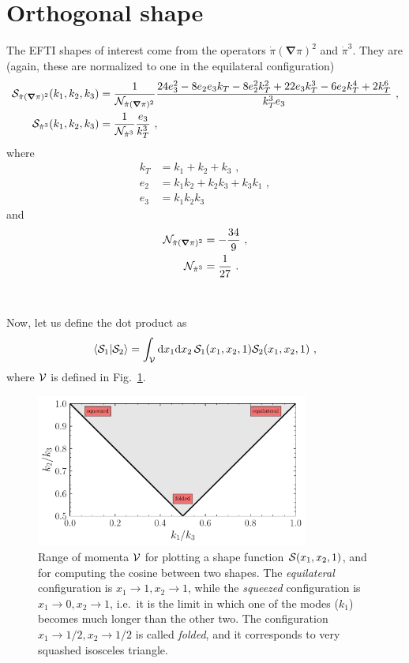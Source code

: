 \documentclass[aps,prd,amsmath,floats,floatfix,superscriptaddress,nofootinbib%
]{revtex4}%
\renewcommand\({\left(}
\renewcommand\){\right)}
\renewcommand\[{\left[}
\renewcommand\]{\right]}
\renewcommand{\vec}{\bm}
\newcommand{\dif}{\mathrm{d}}
\begin{document}
\section{Orthogonal shape}
\label{sec:orthogonal shape}


\noindent The EFTI shapes of interest come from the operators $\dot{\pi}(\vec{\nabla}\pi)^2$ and $\dot{\pi}^3$. They are (again, these are normalized to one in the equilateral configuration) 
\begin{align*}
{\cal S}_{\dot{\pi}(\vec{\nabla}\pi)^2}(k_1,k_2,k_3) &= \frac{1}{{\cal N}_{\dot{\pi}(\vec{\nabla}\pi)^2}}\frac{24e_3^2-8e_2e_3k_T-8e_2^2k_T^2+22e_3k_T^3-6e_2k_T^4+2k_T^6}{k_T^3 e_3}\,\,, \\
{\cal S}_{\dot{\pi}^3}(k_1,k_2,k_3) &= \frac{1}{{\cal N}_{\dot{\pi}^3}}\frac{e_3}{k_T^3}\,\,, 
\end{align*}
where 
\begin{align*}
k_T &= k_1+k_2+k_3\,\,, \\
e_2 &= k_1k_2+k_2k_3+k_3k_1\,\,, \\
e_3 &= k_1k_2k_3%
\end{align*} 
and 
\begin{align*}
{\cal N}_{\dot{\pi}(\vec{\nabla}\pi)^2} &= {-\frac{34}{9}}\,\,, \\
{\cal N}_{\dot{\pi}^3} &= \frac{1}{27}\,\,.
\end{align*}
\\
\\
Now, let us define the dot product as 
\begin{equation}
\braket{{\cal S}_1|{\cal S}_2} = \int_{\cal V}\dif x_1\dif x_2\,{\cal S}_1(x_1,x_2,1){\cal S}_2(x_1,x_2,1)\,\,,
\end{equation} 
where $\cal V$ is defined in Fig.~\ref{fig:region_plot}. 
\begin{figure}[h!]
\centering
\includegraphics[width=0.8\textwidth]{region_plot.pdf}
\caption{Range of momenta $\cal V$ for plotting a shape function ${\cal S}(x_1,x_2,1)$, and for computing the cosine between two shapes. 
The \emph{equilateral} configuration is $x_1\to1,x_2\to 1$, while the \emph{squeezed} configuration is $x_1\to 0,x_2\to 1$, i.e.~it is 
the limit in which one of the modes ($k_1$) becomes much longer than the other two. 
The configuration $x_1\to1/2,x_2\to1/2$ is called \emph{folded}, and it corresponds to very squashed isosceles triangle.} 
\label{fig:region_plot}
\end{figure} 
\end{document}
